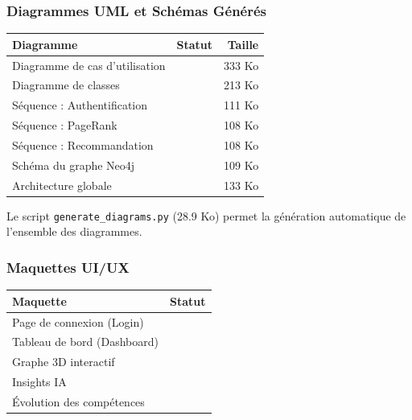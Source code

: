 \documentclass[12pt,a4paper]{article}
\newcommand{\cmark}{\textcolor{vert}{\ding{51}}}
\begin{document}
\subsubsection{Diagrammes UML et Schémas Générés}

\begin{center}
\renewcommand{\arraystretch}{1.3}
\begin{tabular}{|l|c|r|}
\hline
\rowcolor{bleu!15}
\textbf{Diagramme} & \textbf{Statut} & \textbf{Taille} \\
\hline
Diagramme de cas d'utilisation & \cmark & 333 Ko \\
\hline
Diagramme de classes & \cmark & 213 Ko \\
\hline
Séquence : Authentification & \cmark & 111 Ko \\
\hline
Séquence : PageRank & \cmark & 108 Ko \\
\hline
Séquence : Recommandation & \cmark & 108 Ko \\
\hline
Schéma du graphe Neo4j & \cmark & 109 Ko \\
\hline
Architecture globale & \cmark & 133 Ko \\
\hline
\end{tabular}
\end{center}

Le script \texttt{generate\_diagrams.py} (28.9 Ko) permet la génération automatique de l'ensemble des diagrammes.

\subsubsection{Maquettes UI/UX}

\begin{center}
\renewcommand{\arraystretch}{1.3}
\begin{tabular}{|l|c|}
\hline
\rowcolor{bleu!15}
\textbf{Maquette} & \textbf{Statut} \\
\hline
Page de connexion (Login) & \cmark \\
\hline
Tableau de bord (Dashboard) & \cmark \\
\hline
Graphe 3D interactif & \cmark \\
\hline
Insights IA & \cmark \\
\hline
Évolution des compétences & \cmark \\
\hline
\end{tabular}
\end{center}

\end{document}
